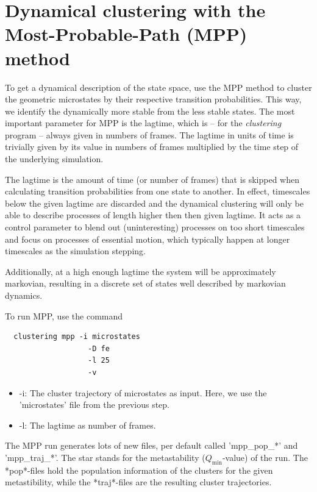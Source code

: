 \documentclass[12pt,a4paper,twoside,english,fleqn]{article}
\begin{document}
\section{Dynamical clustering with the Most-Probable-Path (MPP) method}
To get a dynamical description of the state space, use the MPP method to
cluster the geometric microstates by their respective transition probabilities.
This way, we identify the dynamically more stable from the less stable states.
The most important parameter for MPP is the lagtime, which is -- for the
\emph{clustering} program -- always given in numbers of frames.
The lagtime in units of time is trivially given by its value in numbers of
frames multiplied by the time step of the underlying simulation.

The lagtime is the amount of time (or number of frames) that is skipped when
calculating transition probabilities from one state to another.
In effect, timescales below the given lagtime are discarded and the dynamical
clustering will only be able to describe processes of length higher then then
given lagtime. It acts as a control parameter to blend out (uninteresting)
processes on too short timescales and focus on processes of essential motion,
which typically happen at longer timescales as the simulation stepping.

Additionally, at a high enough lagtime the system will be approximately
markovian, resulting in a discrete set of states well described by markovian
dynamics.

To run MPP, use the command
\begin{lstlisting}
  clustering mpp -i microstates
                   -D fe
                   -l 25
                   -v
\end{lstlisting}

\begin{itemize}
  \item -i: The cluster trajectory of microstates as input. Here, we use the
            'microstates' file from the previous step.
  \item -l: The lagtime as number of frames.
\end{itemize}

The MPP run generates lots of new files, per default called 'mpp\_pop\_*' and
'mpp\_traj\_*'. The star stands for the metastability ($Q_\text{min}$-value)
of the run. The *pop*-files hold the population information of the clusters
for the given metastibility, while the *traj*-files are the resulting cluster
trajectories.
\end{document}
